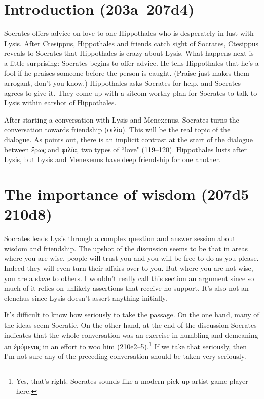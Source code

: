 \documentclass[11pt]{article}
\begin{document}

\section{Introduction (203a--207d4)}

Socrates offers advice on love to one Hippothales who is desperately in lust with Lysis.  After Ctesippus, Hippothales and friends catch sight of Socrates, Ctesippus reveals to Socrates that Hippothales is crazy about Lysis.  What happens next is a little surprising: Socrates begins to offer advice.  He tells Hippothales that he's a fool if he praises someone before the person is caught.  (Praise just makes them arrogant, don't you know.)  Hippothales asks Socrates for help, and Socrates agrees to give it.  They come up with a sitcom-worthy plan for Socrates to talk to Lysis within earshot of Hippothales.

After starting a conversation with Lysis and Menexenus, Socrates turns the conversation towards friendship ({\g φιλία}).  This will be the real topic of the dialogue.  As \citet{watt1987} points out, there is an implicit contrast at the start of the dialogue between {\g ἔρως} and {\g φιλία}, two types of ``love" (119--120).  Hippothales lusts after Lysis, but Lysis and Menexenus have deep friendship for one another.


\section{The importance of wisdom (207d5--210d8)}

Socrates leads Lysis through a complex question and answer session about wisdom and friendship.  The upshot of the discussion seems to be that in areas where you are wise, people will trust you and you will be free to do as you please.  Indeed they will even turn their affairs over to you.  But where you are not wise, you are a slave to others.  I wouldn't really call this section an argument since so much of it relies on unlikely assertions that receive no support.  It's also not an elenchus since Lysis doesn't assert anything initially.

It's difficult to know how seriously to take the passage.  On the one hand, many of the ideas seem Socratic.  On the other hand, at the end of the discussion Socrates indicates that the whole conversation was an exercise in humbling and demeaning an {\g ἐρόμενος} in an effort to woo him (210e2--5).\footnote{Yes, that's right.  Socrates sounds like a modern pick up artist game-player here.}  If we take that seriously, then I'm not sure any of the preceding conversation should be taken very seriously.
\end{document}
